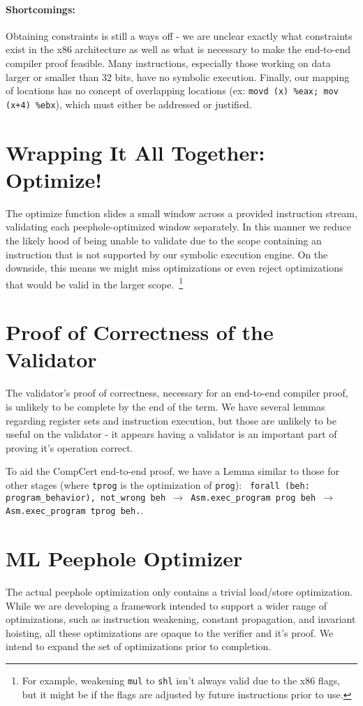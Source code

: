 \documentclass{article}
\begin{document}
\paragraph{Shortcomings: }
Obtaining constraints is still a ways off - we are unclear exactly
what constraints exist in the x86 architecture as well as what is
necessary to make the end-to-end compiler proof feasible.  Many
instructions, especially those working on data larger or smaller than
32 bits, have no symbolic execution.  Finally, our mapping of
locations has no concept of overlapping locations (ex: {\tt movd (x) \%eax;
mov (x+4) \%ebx}), which must either be addressed or justified.

\section{Wrapping It All Together: Optimize!}
The optimize function slides a small window across a provided
instruction stream, validating each peephole-optimized window
separately.  In this manner we reduce the likely hood of being unable
to validate due to the scope containing an instruction that is not
supported by our symbolic execution engine.  On the downside, this
means we might miss optimizations or even reject optimizations that
would be valid in the larger scope.~\footnote{For example, weakening
  {\tt mul} to {\tt shl} isn't always valid due to the x86 flags, but
  it might be if the flags are adjusted by future instructions prior
  to use.}

\section{Proof of Correctness of the Validator}
The validator's proof of correctness, necessary for an end-to-end
compiler proof, is unlikely to be complete by the end of the term.  We
have several lemmas regarding register sets and instruction execution,
but those are unlikely to be useful on the validator - it appears
having a validator is an important part of proving it's operation
correct.

To aid the CompCert end-to-end proof, we have a Lemma similar to those
for other stages (where {\tt tprog} is the optimization of {\tt prog}): {\tt
  forall (beh: program\_behavior), not\_wrong beh $\rightarrow$ Asm.exec\_program
  prog beh $\rightarrow$ Asm.exec\_program tprog beh.}.

\section{ML Peephole Optimizer}
The actual peephole optimization only contains a trivial load/store
optimization.  While we are developing a framework intended to support
a wider range of optimizations, such as instruction weakening,
constant propagation, and invariant hoisting, all these optimizations
are opaque to the verifier and it's proof.  We intend to expand the
set of optimizations prior to completion.
\end{document}
